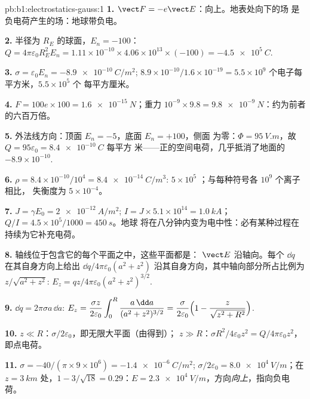 \begin{solution}{pb:b1:electrostatics-gauss:1}
\textbf{1.} $\vect F = -e\vect E$：向上。地表处向下的场
是负电荷产生的场：地球带负电。

\textbf{2.} 半径为 $R_E$ 的球面，$E_n = -100$：$Q = 4\pi\varepsilon_0R_E^2E_n =
1.11 \times 10^{-10} \times 4.06 \times 10^{13} \times (-100) = \qty{-4.5e5}{C}$.

\textbf{3.} $\sigma = \varepsilon_0E_n = \qty{-8.9e-10}{C/m^2}$; $8.9 \times 10^{-10}/1.6 \times
10^{-19} = 5.5 \times 10^9$ 个电子每平方米，$5.5 \times 10^5$ 个
每平方厘米。

\textbf{4.} $F = 100e \times 100 = \qty{1.6e-15}{N}$；重力 $10^{-9} \times 9.8 =
\qty{9.8e-9}{N}$：约为前者的六百万倍。

\textbf{5.} 外法线方向：顶面 $E_n = -5$，底面 $E_n = +100$，侧面
为零：$\Phi = \qty{95}{V.m}$，故 $Q = 95\varepsilon_0 = \qty{+8.4e-10}{C}$ 每平方
米——正的空间电荷，几乎抵消了地面的
$-8.9 \times 10^{-10}$.

\textbf{6.} $\rho = 8.4 \times 10^{-10}/10^4 = \qty{8.4e-14}{C/m^3}$: $5 \times 10^5$
；与每种符号各 $10^9$ 个离子相比，
失衡度为 $5 \times 10^{-4}$。

\textbf{7.} $J = \gamma E_0 = \qty{2e-12}{A/m^2}$; $I = J \times 5.1 \times 10^{14} =
\qty{1.0}{kA}$；$Q/I = 4.5 \times 10^5/1000 = \qty{450}{s}$。地球
将在八分钟内变为电中性：必有某种过程在持续为它补充电荷。

\textbf{8.} 轴线位于包含它的每个平面之中，这些平面都是：
$\vect E$ 沿轴向。每个 $\dd q$ 在其自身方向上给出 $\dd q/4\pi\varepsilon_0(a^2 + z^2)$
沿其自身方向，其中轴向部分所占比例为
$z/\sqrt{a^2 + z^2}$: $E_z = qz/4\pi\varepsilon_0(a^2 + z^2)^{3/2}$.

\textbf{9.} $\dd q = 2\pi\sigma a\,\dd a$: $E_z = \dfrac{\sigma z}{2\varepsilon_0}\displaystyle\int_0^R
\dfrac{a\,\dd a}{(a^2 + z^2)^{3/2}} = \dfrac{\sigma}{2\varepsilon_0}\Bigl(1 - \dfrac{z}{\sqrt{z^2
+ R^2}}\Bigr)$.

\textbf{10.} $z \ll R$：$\sigma/2\varepsilon_0$，即无限大平面（由得到）；
$z \gg R$：$\sigma R^2/4\varepsilon_0z^2 = Q/4\pi\varepsilon_0z^2$，即点电荷。

\textbf{11.} $\sigma = -40/(\pi \times 9 \times 10^6) = \qty{-1.4e-6}{C/m^2}$; $\sigma/2\varepsilon_0 =
\qty{8.0e4}{V/m}$；在 $z = \qty{3}{km}$ 处，$1 - 3/\sqrt{18} = 0.29$：$E =
\qty{2.3e4}{V/m}$，方向\emph{向上}，指向负电荷。


\end{solution}
